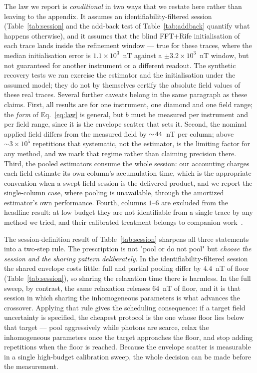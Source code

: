 \documentclass[aps,pra,twocolumn,superscriptaddress,nofootinbib]{revtex4-2}
\begin{document}
The law we report is \emph{conditional} in two ways that we restate here rather than
leaving to the appendix. It assumes an identifiability-filtered session (Table~\ref{tab:session}
and the add-back test of Table~\ref{tab:addback} quantify what happens otherwise), and it
assumes that the blind FFT$+$Rife initialisation of each trace lands inside the refinement
window --- true for these traces, where the median initialisation error is
$1.1\times10^{3}$~nT against a $\pm3.2\times10^{3}$~nT window, but not guaranteed for another
instrument or a different readout. The synthetic recovery tests we ran exercise the estimator
and the initialisation under the assumed model; they do not by themselves certify the absolute
field values of these real traces. Several further caveats belong in the same paragraph as
these claims. First, all results are for
one instrument, one diamond and one field range; the \emph{form} of Eq.~\eqref{eq:law} is
general, but $b$ must be measured per instrument and per field range, since it is the
envelope scatter that sets it. Second, the nominal applied field differs from the measured
field by $\sim\!44$~nT per column; above $\sim\!3\times10^{5}$ repetitions that
systematic, not the estimator, is the limiting factor for any method, and we mark that
regime rather than claiming precision there. Third, the pooled estimators consume the whole
session: our accounting charges each field estimate its own column's accumulation time,
which is the appropriate convention when a swept-field session is the delivered product, and
we report the single-column case, where pooling is unavailable, through the amortized
estimator's own performance. Fourth, columns $1$--$6$ are excluded from the headline result:
at low budget they are not identifiable from a single trace by any method we tried, and
their calibrated treatment belongs to companion work~\cite{L1companion}.

The session-definition result of Table~\ref{tab:session} sharpens all three statements
into a two-step rule. The prescription is not "pool or do not pool" but \emph{choose the session and the sharing
pattern deliberately}. In the identifiability-filtered session the shared envelope costs
little: full and partial pooling differ by $4.4$~nT of floor (Table~\ref{tab:session}), so
sharing the relaxation time there is harmless. In the full sweep, by contrast, the same
relaxation releases $64$~nT of floor, and it is that session in which sharing the
inhomogeneous parameters is what advances the crossover. Applying
that rule gives the scheduling consequence: if a target field uncertainty is specified, the
cheapest protocol is the one whose floor lies below that target --- pool aggressively while
photons are scarce, relax the inhomogeneous parameters once the target approaches the floor,
and stop adding repetitions when the floor is reached. Because the envelope scatter is
measurable in a single high-budget calibration sweep, the whole decision can be made before
the measurement.
\end{document}
